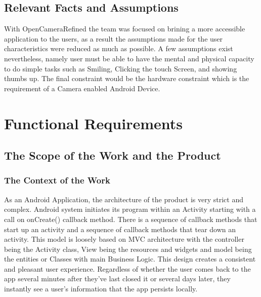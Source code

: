 \documentclass[12pt, titlepage]{article}
\begin{document}
\subsection{Relevant Facts and Assumptions}
{\color{red} With OpenCameraRefined the team was focused on brining a more accessible application to the users, as a result the assumptions made for the user characteristics were reduced as much as possible. A few assumptions exist nevertheless, namely user must be able to have the mental and physical capacity to do simple tasks such as Smiling, Clicking the touch Screen, and showing thumbs up. The final constraint would be the hardware constraint which is the requirement of a Camera enabled Android Device. }

\section{Functional Requirements}

\subsection{The Scope of the Work and the Product}

\subsubsection{The Context of the Work}
{\color{red} As an Android Application, the architecture of the product is very strict and complex. Android system initiates its program within an Activity starting with a call on onCreate() callback method. There is a sequence of callback methods that start up an activity and a sequence of callback methods that tear down an activity. This model is loosely based on MVC architecture with the controller being the Activity class, View being the resources and widgets and model being the entities or Classes with main Business Logic. This design creates a consistent and pleasant user experience. Regardless of whether the user comes back to the app several minutes after they've last closed it or several days later, they instantly see a user's information that the app persists locally. 
}
\end{document}
